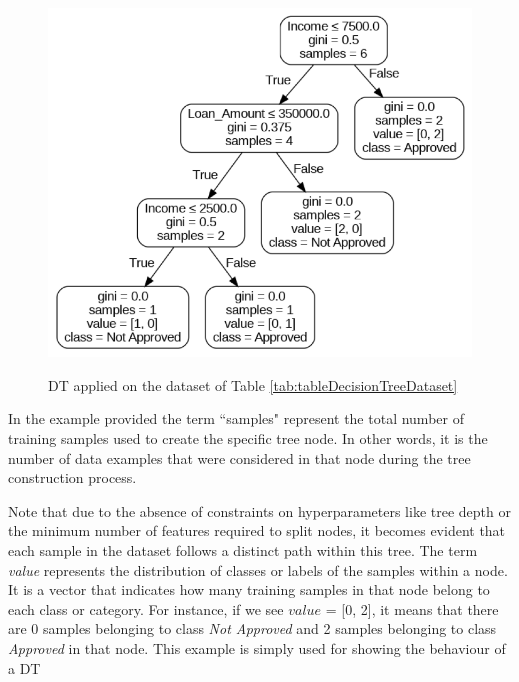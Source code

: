 \begin{figure}[H]
  \centering
  \includegraphics[width=0.6\linewidth]{graphics/DecTree.png}
  \label{fig:knn5}
  \caption{DT applied on the dataset of Table \ref{tab:tableDecisionTreeDataset}}
\end{figure}
In the example provided the term “samples" represent the total number of training samples used to create the specific tree node. 
In other words, it is the number of data examples that were considered in that node during the tree construction process.

Note that due to the absence of constraints on hyperparameters like tree depth or the minimum number of features required to split nodes, 
it becomes evident that each sample in the dataset follows a distinct path within this tree. 
The term \textit{value} represents the distribution of classes or labels of the samples within a node. 
It is a vector that indicates how many training samples in that node belong to each class or category. 
For instance, if we see $value$ = [0, 2], it means that there are 0 samples belonging to class \textit{Not Approved} and 2 samples belonging to class \textit{Approved} in that node.
This example is simply used for showing the behaviour of a DT\\

